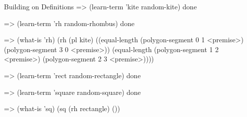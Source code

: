 \begin{repl-example}{Building on Definitions}
=> (learn-term 'kite random-kite)
done

=> (learn-term 'rh random-rhombus)
done

=> (what-is 'rh)
(rh
 (pl kite)
 ((equal-length (polygon-segment 0 1 <premise>)
                (polygon-segment 3 0 <premise>))
  (equal-length (polygon-segment 1 2 <premise>)
                (polygon-segment 2 3 <premise>))))

=> (learn-term 'rect random-rectangle)
done

=> (learn-term 'square random-square)
done

=> (what-is 'sq)
(sq (rh rectangle) ())
\end{repl-example}
